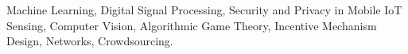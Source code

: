 \vspace{-.1in}

\begin{cvparagraph}
	\normalsize
	Machine Learning,
		Digital Signal Processing,
	Security and Privacy in Mobile IoT Sensing,
	Computer Vision,
	Algorithmic Game Theory,
	Incentive Mechanism Design,
	Networks,
	Crowdsourcing.
\end{cvparagraph}

%	
%	
%	
%	
%	
